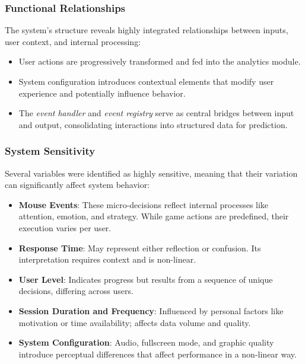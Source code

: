 \documentclass{article}
\begin{document}
\subsubsection*{Functional Relationships}

The system's structure reveals highly integrated relationships between inputs, user context, and internal processing:

\begin{itemize}
    \item User actions are progressively transformed and fed into the analytics module.
    \item System configuration introduces contextual elements that modify user experience and potentially influence behavior.
    \item The \textit{event handler} and \textit{event registry} serve as central bridges between input and output, consolidating interactions into structured data for prediction.
\end{itemize}

\subsubsection*{System Sensitivity}

Several variables were identified as highly sensitive, meaning that their variation can significantly affect system behavior:

\begin{itemize}
    \item \textbf{Mouse Events}: These micro-decisions reflect internal processes like attention, emotion, and strategy. While game actions are predefined, their execution varies per user.
    
    \item \textbf{Response Time}: May represent either reflection or confusion. Its interpretation requires context and is non-linear.
    
    \item \textbf{User Level}: Indicates progress but results from a sequence of unique decisions, differing across users.
    
    \item \textbf{Session Duration and Frequency}: Influenced by personal factors like motivation or time availability; affects data volume and quality.
    
    \item \textbf{System Configuration}: Audio, fullscreen mode, and graphic quality introduce perceptual differences that affect performance in a non-linear way.
\end{itemize}
\end{document}

